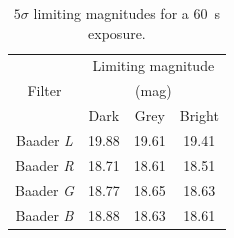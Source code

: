 \begin{colsection}
\begin{table}[t]
    \begin{center}
        \begin{tabular}{c|ccc} %
                   & \multicolumn{3}{c}{Limiting magnitude} \\
            Filter & \multicolumn{3}{c}{(mag)} \\
                   & Dark & Grey & Bright \\
            \midrule
            Baader \textit{L} & 19.88 & 19.61 & 19.41 \\
            Baader \textit{R} & 18.71 & 18.61 & 18.51 \\
            Baader \textit{G} & 18.77 & 18.65 & 18.63 \\
            Baader \textit{B} & 18.88 & 18.63 & 18.61 \\
        \end{tabular}
    \end{center}
    \caption[$5\sigma$ limiting magnitudes for a \SI{60}{\second} exposure]{
        $5\sigma$ limiting magnitudes for a \SI{60}{\second} exposure.
    }\label{tab:lim_mags}
\end{table}

\newpage

\end{colsection}


